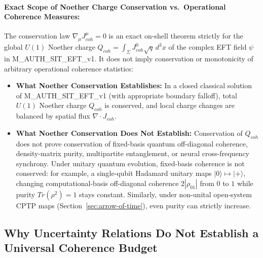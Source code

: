 \documentclass[american,11pt,letterpaper]{article}
\def\mathbf#1{#1}%
\def\mathrm#1{#1}%
\def\texttt#1{#1}%
\def\emph#1{#1}%
\begin{document}
\paragraph{Exact Scope of Noether Charge Conservation vs.\ Operational Coherence Measures:}
The conservation law $\nabla_\mu J^\mu_{\mathrm{coh}} = 0$ is an exact on-shell theorem strictly for the global $U(1)$ Noether charge $Q_{\mathrm{coh}} = \int_\Sigma J^0_{\mathrm{coh}}\sqrt{q}\,d^3x$ of the complex EFT field $\psi$ in \texttt{M\_AUTH\_SIT\_EFT\_v1}. It does \emph{not} imply conservation or monotonicity of arbitrary operational coherence statistics:
\begin{itemize}
    \item \textbf{What Noether Conservation Establishes:} In a closed classical solution of \texttt{M\_AUTH\_SIT\_EFT\_v1} (with appropriate boundary falloff), total $U(1)$ Noether charge $Q_{\mathrm{coh}}$ is conserved, and local charge changes are balanced by spatial flux $\nabla\cdot\mathbf{J}_{\mathrm{coh}}$.
    \item \textbf{What Noether Conservation Does \emph{Not} Establish:} Conservation of $Q_{\mathrm{coh}}$ does \emph{not} prove conservation of fixed-basis quantum off-diagonal coherence, density-matrix purity, multipartite entanglement, or neural cross-frequency synchrony. Under unitary quantum evolution, fixed-basis coherence is \emph{not} conserved: for example, a single-qubit Hadamard unitary maps $|0\rangle \mapsto |+\rangle$, changing computational-basis off-diagonal coherence $2|\rho_{01}|$ from $0$ to $1$ while purity $\mathrm{Tr}(\rho^2) = 1$ stays constant. Similarly, under non-unital open-system CPTP maps (Section~\ref{sec:arrow-of-time}), even purity can strictly increase.
\end{itemize}

\subsection{Why Uncertainty Relations Do Not Establish a Universal Coherence Budget}
\label{subsec:uncertainty-vs-coherence}
\end{document}
